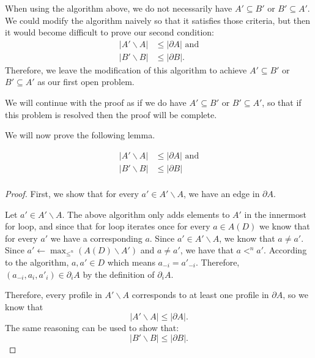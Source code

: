 	\begin{openproblem}
		\label{lemma-8-open-problem}
		When using the algorithm above, we do not necessarily have $A' \subseteq B'$ or $B' \subseteq A'$. We could modify the algorithm naively so that it satisfies those criteria, but then it would become difficult to prove our second condition:
		\begin{align*}
			|A' \backslash A| &\le |\partial A| \textrm{ and} \\
			|B' \backslash B| &\le |\partial B|.
		\end{align*}
		Therefore, we leave the modification of this algorithm to achieve $A' \subseteq B'$ or $B' \subseteq A'$ as our first open problem.

		We will continue with the proof as if we do have $A' \subseteq B'$ or $B' \subseteq A'$, so that if this problem is resolved then the proof will be complete.
	\end{openproblem}

	We will now prove the following lemma.
	\begin{lemma}
		\label{lemma-8-enough-edges}
		\begin{align*}
			|A' \backslash A| &\le |\partial A| \textrm{ and} \\
			|B' \backslash B| &\le |\partial B| \\
		\end{align*}
	\end{lemma}

	\begin{proof}
		First, we show that for every $a' \in A' \backslash A$, we have an edge in $\partial A$.

		Let $a' \in A' \backslash A$. The above algorithm only adds elements to $A'$ in the innermost for loop, and since that for loop iterates once for every $a \in A(D)$ we know that for every $a'$ we have a corresponding $a$. Since $a' \in A' \backslash A$, we know that $a \ne a'$. Since $a' \gets \max_{\le^n}(A(D) \backslash A')$ and $a \ne a'$, we have that $a <^n a'$. According to the algorithm, $a, a' \in D$ which means $a_{-i} = a'_{-i}$. Therefore, $(a_{-i}, a_i, a'_i) \in \partial_i A$ by the definition of $\partial_i A$.

		Therefore, every profile in $A' \backslash A$ corresponds to at least one profile in $\partial A$, so we know that
		\[
			|A' \backslash A| \le |\partial A|.
		\]
		The same reasoning can be used to show that:
		\[
			|B' \backslash B| \le |\partial B|.
		\]
	\end{proof}

